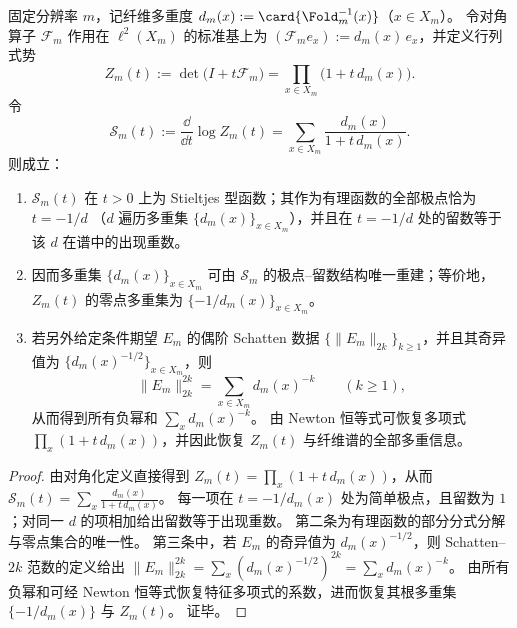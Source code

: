 \begin{theorem}\label{thm:pom-fiber-spectrum-stieltjes-rigidity-determinant-schatten}
固定分辨率 \(m\)，记纤维多重度 \(d_m(x):=\card{\Fold_m^{-1}(x)}\)（\(x\in X_m\)）。
令对角算子 \(\mathcal F_m\) 作用在 \(\ell^2(X_m)\) 的标准基上为
\(
(\mathcal F_m e_x):=d_m(x)\,e_x
\)，并定义行列式势
\[
Z_m(t):=\det\!\bigl(I+t\mathcal F_m\bigr)=\prod_{x\in X_m}\bigl(1+t\,d_m(x)\bigr).
\]
令
\[
\mathcal S_m(t):=\frac{\dd}{\dd t}\log Z_m(t)=\sum_{x\in X_m}\frac{d_m(x)}{1+t\,d_m(x)}.
\]
则成立：
\begin{enumerate}
  \item \(\mathcal S_m(t)\) 在 \(t>0\) 上为 Stieltjes 型函数；其作为有理函数的全部极点恰为
  \(
  t=-1/d
  \)
  （\(d\) 遍历多重集 \(\{d_m(x)\}_{x\in X_m}\)），并且在 \(t=-1/d\) 处的留数等于该 \(d\) 在谱中的出现重数。
  \item 因而多重集 \(\{d_m(x)\}_{x\in X_m}\) 可由 \(\mathcal S_m\) 的极点--留数结构唯一重建；等价地，\(Z_m(t)\) 的零点多重集为 \(\{-1/d_m(x)\}_{x\in X_m}\)。
  \item 若另外给定条件期望 \(E_m\) 的偶阶 Schatten 数据 \(\{\|E_m\|_{2k}\}_{k\ge 1}\)，并且其奇异值为 \(\{d_m(x)^{-1/2}\}_{x\in X_m}\)，则
  \[
  \|E_m\|_{2k}^{2k}=\sum_{x\in X_m}d_m(x)^{-k}\qquad(k\ge 1),
  \]
  从而得到所有负幂和 \(\sum_x d_m(x)^{-k}\)。
  由 Newton 恒等式可恢复多项式 \(\prod_x(1+t\,d_m(x))\)，并因此恢复 \(Z_m(t)\) 与纤维谱的全部多重信息。
\end{enumerate}
\end{theorem}

\begin{proof}
由对角化定义直接得到
\(
Z_m(t)=\prod_x(1+t\,d_m(x))
\)，从而
\(
\mathcal S_m(t)=\sum_x \frac{d_m(x)}{1+t\,d_m(x)}
\)。
每一项在 \(t=-1/d_m(x)\) 处为简单极点，且留数为 \(1\)；对同一 \(d\) 的项相加给出留数等于出现重数。
第二条为有理函数的部分分式分解与零点集合的唯一性。
第三条中，若 \(E_m\) 的奇异值为 \(d_m(x)^{-1/2}\)，则 Schatten--\(2k\) 范数的定义给出
\(
\|E_m\|_{2k}^{2k}=\sum_x (d_m(x)^{-1/2})^{2k}=\sum_x d_m(x)^{-k}
\)。
由所有负幂和可经 Newton 恒等式恢复特征多项式的系数，进而恢复其根多重集 \(\{-1/d_m(x)\}\) 与 \(Z_m(t)\)。
证毕。
\end{proof}

